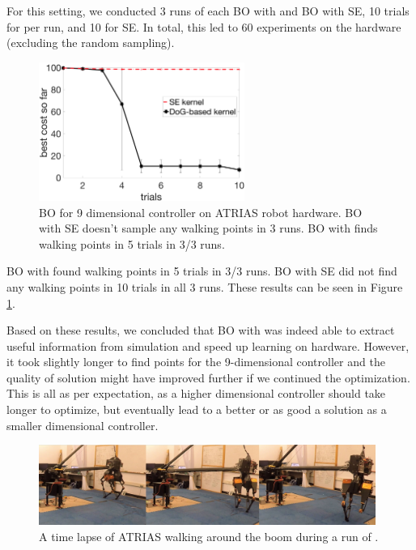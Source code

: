 For this setting, we conducted 3 runs of each BO with \dogkernel and BO with SE, 10 trials for \dogkernel per run, and 10 for SE. In total, this led to 60 experiments on the hardware (excluding the random sampling). 

\begin{figure}[t]
\centering
\includegraphics[width=0.6\textwidth]{img/hw_raibert_9d.png}
\caption{\small{BO for 9 dimensional controller on ATRIAS robot hardware. BO with SE doesn't sample any walking points in 3 runs. BO with \dogkernel finds walking points in 5 trials in 3/3 runs.}}
\label{fig:hw_raibert_9d}
\end{figure}

BO with \dogkernel found walking points in 5 trials in 3/3 runs. BO with SE did not find any walking points in 10 trials in all 3 runs. These results can be seen in Figure \ref{fig:hw_raibert_9d}.

Based on these results, we concluded that BO with \dogkernel was indeed able to extract useful information from simulation and speed up learning on hardware. However, it took slightly longer to find points for the 9-dimensional controller and the quality of solution might have improved further if we continued the optimization. This is all as per expectation, as a higher dimensional controller should take longer to optimize, but eventually lead to a better or as good a solution as a smaller dimensional controller. 

\begin{figure}
\centering
\includegraphics[width=0.98\textwidth]{img/atrias_time_lapse.jpg}
\caption{\small{A time lapse of ATRIAS walking around the boom during a run of \dogkernel.}}
\label{fig:bo_runs_atrias_hw_slides}
\end{figure}


